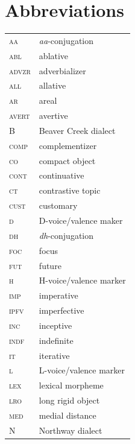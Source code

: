 \documentclass[output=paper,colorlinks,citecolor=brown]{langscibook}
\begin{document}
\section*{Abbreviations}

\begin{tabularx}{.5\textwidth}{@{}lQ@{}}
\textsc{aa} & \textit{aa}-conjugation \\
\textsc{abl} & ablative \\
\textsc{advzr} & adverbializer \\
\textsc{all} & allative \\
\textsc{ar} & areal \\
\textsc{avert} & avertive \\
B & Beaver Creek dialect \\
\textsc{comp} & complementizer \\
\textsc{co} & compact object \\
\textsc{cont} & continuative \\
\textsc{ct} & contrastive topic \\
\textsc{cust} & customary \\
\textsc{d} & D-voice/valence maker \\
\textsc{dh} & \textit{dh}-conjugation \\
\textsc{foc} & focus \\
\textsc{fut} & future \\
\textsc{h} & H-voice/valence marker \\
\textsc{imp} & imperative \\
\textsc{ipfv} & imperfective \\
\textsc{inc} & inceptive \\
\textsc{indf} & indefinite \\
\textsc{it} & iterative \\
\textsc{l} & L-voice/valence marker \\
\textsc{lex} & lexical morpheme \\
\textsc{lro} & long rigid object \\
\textsc{med} & medial distance \\
N & Northway dialect \end{tabularx}%
\end{document}
